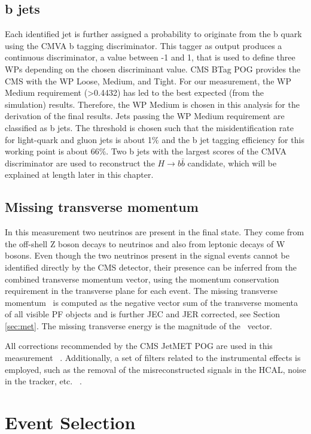 \subsection{b jets}\label{sec:bjets}
Each identified jet is further assigned a probability to originate from the b quark using the CMVA b tagging discriminator. This tagger as output produces a continuous discriminator, a value between -1 and 1, that is used to define three WPs depending on the chosen discriminant value. CMS BTag POG provides the CMS with the WP Loose, Medium, and Tight. For our measurement, the WP Medium requirement (>0.4432) has led to the best expected (from the simulation) results. Therefore, the WP Medium is chosen in this analysis for the derivation of the final results. Jets passing the WP Medium requirement are classified as b jets. The threshold is chosen such that the misidentification rate for light-quark and gluon jets is about 1$\%$ and the b jet tagging efficiency for this working point is about 66$\%$. Two b jets with the largest scores of the CMVA discriminator are used to reconstruct the $H \to b\bar{b}$ candidate, which will be explained at length later in this chapter. 

\subsection{Missing transverse momentum}
In this measurement two neutrinos are present in the final state. They come from the off-shell Z boson decays to neutrinos and also from leptonic decays of W bosons. Even though the two neutrinos present in the signal events cannot be identified directly by the CMS detector, their presence can be inferred from the combined transverse momentum vector, using the momentum conservation requirement in the transverse plane for each event. The missing transverse momentum ~\PTslash is computed as the negative vector sum of the transverse momenta of all visible PF objects and is further JEC and JER corrected, see Section \ref{sec:met}. The missing transverse energy \ETslash is the magnitude of the ~\PTslash vector. 

All corrections recommended by the CMS JetMET POG are used in this measurement ~\cite{MissingETRun2Corrections}. Additionally, a set of filters related to the instrumental effects is employed, such as the removal of the misreconstructed signals in the HCAL, noise in the tracker, etc. ~\cite{MissingETOptionalFiltersRun2}. 

\section{Event Selection}\label{sec:selection}

